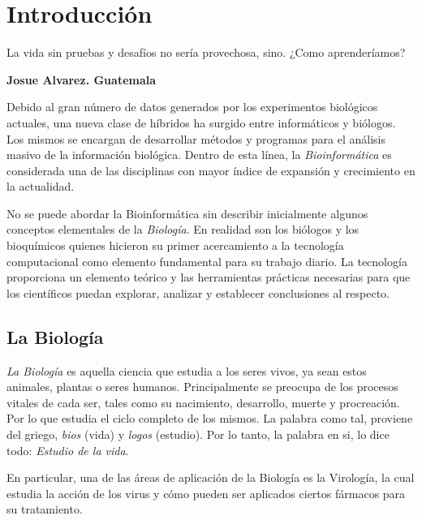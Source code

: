 \chapter*{Introducción}
\label{intro}

\epigraph{La vida sin pruebas y desafíos no sería provechosa, sino. ¿Como aprenderíamos?}%
{\textbf{Josue Alvarez. Guatemala }}

\par Debido al gran número de datos generados por los experimentos biológicos actuales, una nueva clase de híbridos ha surgido entre informáticos y biólogos. Los mismos se encargan de desarrollar métodos y programas para el análisis masivo de la información biológica. Dentro de esta línea, la \emph{Bioinformática} es considerada una de las disciplinas con mayor índice de expansión y crecimiento en la actualidad. 

\par No se puede abordar la Bioinformática sin describir inicialmente algunos conceptos elementales de la \emph{Biología}. En realidad son los biólogos y los bioquímicos quienes hicieron su primer acercamiento a la tecnología computacional como elemento fundamental para su trabajo diario. La tecnología proporciona un elemento teórico y las herramientas prácticas necesarias para que los científicos puedan explorar, analizar y establecer conclusiones al respecto.

\section*{La Biología}

\par \emph{La Biología} es aquella ciencia que estudia a los seres vivos, ya sean estos animales, plantas o seres humanos. Principalmente se preocupa de los procesos vitales de cada ser, tales como su nacimiento, desarrollo, muerte y procreación. Por lo que estudia el ciclo completo de los mismos\cite{curtis}. La palabra como tal, proviene del griego, \emph{bios} (vida) y \emph{logos} (estudio). Por lo tanto, la palabra en si, lo dice todo: \emph{Estudio de la vida}.

\par En particular, una de las áreas de aplicación de la Biología es la Virología, la cual estudia la acción de los virus y cómo pueden ser aplicados ciertos fármacos para su tratamiento.


